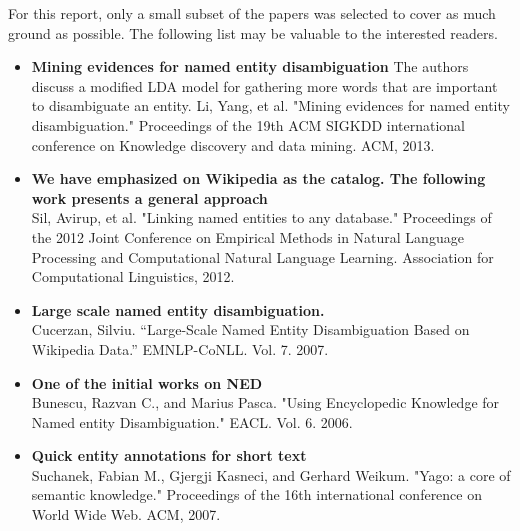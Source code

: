 For this report, only a small subset of the papers was selected to cover as much ground as possible.
The following list may be valuable to the interested readers.

\begin{itemize}
\item \textbf{Mining evidences for named entity disambiguation}
The authors discuss a modified LDA model for gathering more words that are important to disambiguate an entity. 
Li, Yang, et al. "Mining evidences for named entity disambiguation." Proceedings of the 19th ACM SIGKDD international conference on Knowledge discovery and data mining. ACM, 2013.
 \item \textbf{We have emphasized on Wikipedia as the catalog. The following work presents a general approach} \\
 Sil, Avirup, et al. "Linking named entities to any database." Proceedings of the 2012 Joint Conference on Empirical Methods in Natural Language Processing and Computational Natural Language Learning. Association for Computational Linguistics, 2012.
 \item \textbf{Large scale named entity disambiguation.} \\
 Cucerzan, Silviu. ``Large-Scale Named Entity Disambiguation Based on Wikipedia Data.'' EMNLP-CoNLL. Vol. 7. 2007.
 \item \textbf{One of the initial works on NED} \\
 Bunescu, Razvan C., and Marius Pasca. "Using Encyclopedic Knowledge for Named entity Disambiguation." EACL. Vol. 6. 2006.
 \item \textbf{Quick entity annotations for short text} \\
 Suchanek, Fabian M., Gjergji Kasneci, and Gerhard Weikum. "Yago: a core of semantic knowledge." Proceedings of the 16th international conference on World Wide Web. ACM, 2007.
\end{itemize}
